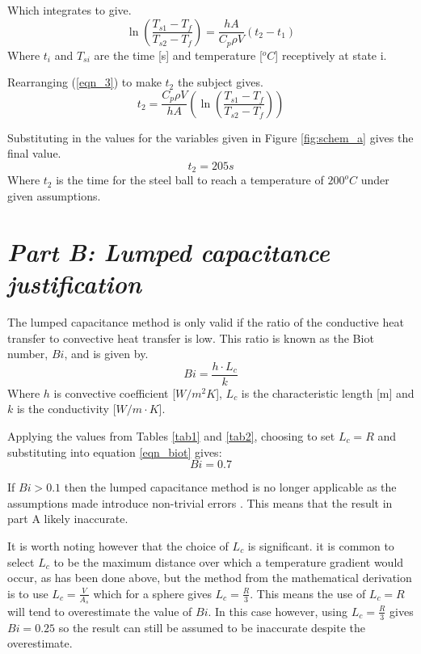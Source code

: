 \documentclass[11pt]{article}
\begin{document}
Which integrates to give.
\begin{equation}\label{eqn_3}
	\ln{(\frac{T_{s1}-T_{f}}{T_{s2}-T_{f}})} =  \frac{hA}{C_{p}\rho V}(t_{2}-t_{1})
\end{equation}
Where $t_{i}$ and $T_{si}$ are the time [s] and temperature [$^oC$] receptively at state i.

Rearranging (\ref{eqn_3}) to make $t_{2}$ the subject gives.
\begin{equation}\label{key}
	t_{2} = \frac{C_{p}\rho V}{hA}(\ln{(\frac{T_{s1}-T_{f}}{T_{s2}-T_{f}})})
\end{equation}

Substituting in the values for the variables given in Figure \ref{fig:schem_a} gives the final value.
\boldmath
\begin{equation}\label{key}
	t_2 = 205 s
\end{equation}
\unboldmath
Where $t_2$ is the time for the steel ball to reach a temperature of $200^{o}C$ under given assumptions.

\section{\emph{Part B: Lumped capacitance justification}}
The lumped capacitance method is only valid if the ratio of the conductive heat transfer to convective heat transfer is low. This ratio is known as the Biot number, $Bi$, and is given by.
\begin{equation}\label{eqn_biot}
	Bi = \frac{h \cdot L_{c}}{k}
\end{equation}
Where $h$ is convective coefficient [$W/m^{2}K$], $L_{c}$ is the characteristic length [m] and $k$ is the conductivity [$W/m \cdot K$]. 

Applying the values from Tables \ref{tab1} and \ref{tab2}, choosing to set $L_{c}=R$ and substituting into equation \ref{eqn_biot} gives:
\begin{equation}\label{key}
	Bi = 0.7
\end{equation}

If $Bi > 0.1$ then the lumped capacitance method is no longer applicable as the assumptions made introduce non-trivial errors \cite{bergman_fundamentals_2011}. This means that the result in part A likely inaccurate.

It is worth noting however that the choice of $L_c$ is significant. it is common to select $L_c$ to be the maximum distance over which a temperature gradient would occur, as has been done above, but the method from the mathematical derivation is to use $L_c = \frac{V}{A_s}$ which for a sphere gives $L_c = \frac{R}{3}$. This means the use of $L_c = R$ will tend to overestimate the value of $Bi$. In this case however, using $L_c = \frac{R}{3}$ gives $Bi = 0.25$ so the result can still be assumed to be inaccurate despite the overestimate.
\end{document}
